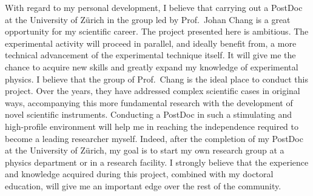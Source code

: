 \documentclass[a4paper, 12pt]{article}
\begin{document}
With regard to my personal development, I believe that carrying out a PostDoc at the University of Zürich in the group led by Prof.~Johan Chang is a great opportunity for my scientific career. 
The project presented here is ambitious. 
The experimental activity will proceed in parallel, and ideally benefit from, a more technical advancement of the experimental technique itself.
It will give me the chance to acquire new skills and greatly expand my knowledge of experimental physics. 
I believe that the group of Prof.~Chang is the ideal place to conduct this project. 
Over the years, they have addressed complex  scientific cases in original ways, accompanying this more fundamental research with the development of novel scientific instruments.
Conducting a PostDoc in such a stimulating and high-profile environment will help me in reaching the independence required to become a leading researcher myself.
Indeed, after the completion of my PostDoc at the University of Zürich, my goal is to start my own research group at a physics department or in a research facility. 
I strongly believe that the experience and knowledge acquired during this project, combined with my doctoral education, will give me an important edge over the rest of the community. 



\nocite{apsrev41Control}    %

\end{document}
